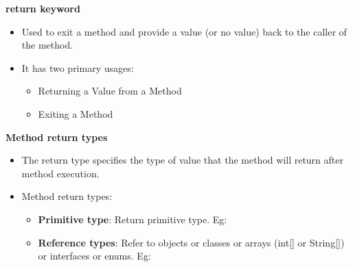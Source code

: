\begin{flushleft}
\begin{itemize}
\begin{itemize}
		\end{itemize}
	\end{itemize}

	\textbf{return keyword}
	\begin{itemize}
		\item Used to exit a method and provide a value (or no value) back to the caller of the method. 
		\bigskip
		\item It has two primary usages:
		\begin{itemize}
			\item Returning a Value from a Method
			\item Exiting a Method
		\end{itemize}
	\end{itemize}

	\newpage
	\textbf{Method return types}
	\begin{itemize}
		\item The return type specifies the type of value that the method will return after method execution.
		\item Method return types:
		\begin{itemize}
			\item \textbf{Primitive type}: Return primitive type. Eg:
			\item \textbf{Reference types}: Refer to objects or classes or arrays (int[] or String[]) or interfaces or enums. Eg:


\end{itemize}
\end{itemize}
\end{flushleft}
